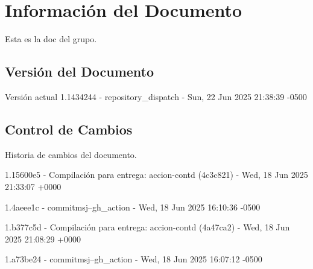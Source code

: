 \documentclass[
	a4paper, %
	12pt, %
]{include/CSSullivanBusinessReport}
\begin{document}
\newpage

\begin{twothirdswidth} %
	\tableofcontents %
\end{twothirdswidth}

\newpage


\newpage

\section{Información del
Documento}\label{sec:informaciuxf3n-del-documento}

Esta es la doc del grupo.

\subsection{Versión del Documento}\label{sec:versiuxf3n-del-documento}

\begin{quote}
\end{quote}

Versión actual 1.1434244 - repository\_dispatch - Sun, 22 Jun 2025
21:38:39 -0500

\subsection{Control de Cambios}\label{sec:control-de-cambios}

Historia de cambios del documento.

1.15600e5 - Compilación para entrega: accion-contd (4c3c821) - Wed, 18
Jun 2025 21:33:07 +0000

1.4aeee1c - commitmsj--gh\_action - Wed, 18 Jun 2025 16:10:36 -0500

1.b377c5d - Compilación para entrega: accion-contd (4a47ca2) - Wed, 18
Jun 2025 21:08:29 +0000

1.a73be24 - commitmsj--gh\_action - Wed, 18 Jun 2025 16:07:12 -0500
\end{document}

